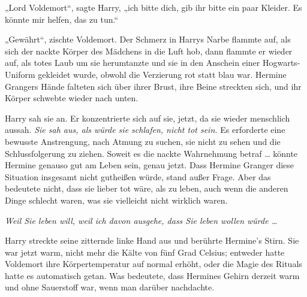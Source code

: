 „Lord Voldemort“, sagte Harry, „ich bitte dich, gib ihr bitte ein paar Kleider. Es könnte mir helfen, das zu tun.“

„Gewährt“, zischte Voldemort.
Der Schmerz in Harrys Narbe flammte auf, als sich der nackte Körper des Mädchens in die Luft hob, dann flammte er wieder auf, als totes Laub um sie herumtanzte und sie in den Anschein einer Hogwarts-Uniform gekleidet wurde, obwohl die Verzierung rot statt blau war. Hermine Grangers Hände falteten sich über ihrer Brust, ihre Beine streckten sich, und ihr Körper schwebte wieder nach unten.

Harry sah sie an. Er konzentrierte sich auf sie, jetzt, da sie wieder menschlich aussah.
\emph{Sie sah aus, als würde sie schlafen, nicht tot sein.} Es erforderte eine bewusste Anstrengung, nach Atmung zu suchen, sie nicht zu sehen und die Schlussfolgerung zu ziehen. Soweit es die nackte Wahrnehmung betraf … könnte Hermine genauso gut am Leben sein, genau jetzt.
Dass Hermine Granger diese Situation insgesamt nicht gutheißen würde, stand außer Frage. Aber das bedeutete nicht, dass sie lieber tot wäre, als zu leben, auch wenn die anderen Dinge schlecht waren, was sie vielleicht nicht wirklich waren.

\emph{Weil Sie leben will, weil ich davon ausgehe, dass Sie leben wollen würde …}

Harry streckte seine zitternde linke Hand aus und berührte Hermine’s Stirn. Sie war jetzt warm, nicht mehr die Kälte von fünf Grad Celsius; entweder hatte Voldemort ihre Körpertemperatur auf normal erhöht, oder die Magie des Rituals hatte es automatisch getan. Was bedeutete, dass Hermines Gehirn derzeit warm und ohne Sauerstoff war, wenn man darüber nachdachte.

